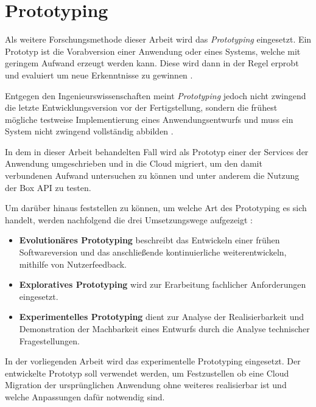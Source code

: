 \section{Prototyping}

Als weitere Forschungsmethode dieser Arbeit wird das \textit{Prototyping} eingesetzt. Ein Prototyp ist die Vorabversion einer Anwendung oder eines Systems, welche mit geringem Aufwand erzeugt werden kann. Diese wird dann in der Regel erprobt und evaluiert um neue Erkenntnisse zu gewinnen \cite[Vgl.][S. 282]{Wilde2007}\cite[Vgl.][S. 114]{Heinrich2011}.

Entgegen den Ingenieurswissenschaften meint \textit{Prototyping} jedoch nicht zwingend die letzte Entwicklungsversion vor der Fertigstellung, sondern die frühest mögliche testweise Implementierung eines Anwendungsentwurfs \cite[Vgl.][S. 114]{Heinrich2011} und muss ein System nicht zwingend vollständig abbilden \cite[Vgl.][S. 119]{Heinrich2011}.

In dem in dieser Arbeit behandelten Fall wird als Prototyp einer der Services der Anwendung umgeschrieben und in die Cloud migriert, um den damit verbundenen Aufwand untersuchen zu können und unter anderem die Nutzung der \gls{Box} \ac{API} zu testen.

Um darüber hinaus feststellen zu können, um welche Art des Prototyping es sich handelt, werden nachfolgend die drei Umsetzungswege aufgezeigt \cite[Vgl. auch im Folgenden][S. 370]{Alpar2019}:
\begin{itemize}
    \item \textbf{Evolutionäres Prototyping} beschreibt das Entwickeln einer frühen Softwareversion und das anschließende kontinuierliche weiterentwickeln, mithilfe von Nutzerfeedback.
    \item \textbf{Exploratives Prototyping} wird zur Erarbeitung fachlicher Anforderungen eingesetzt.
    \item \textbf{Experimentelles Prototyping} dient zur Analyse der Realisierbarkeit und Demonstration der Machbarkeit eines Entwurfs durch die Analyse technischer Fragestellungen.
\end{itemize}

In der vorliegenden Arbeit wird das experimentelle Prototyping eingesetzt. Der entwickelte Prototyp soll verwendet werden, um Festzustellen ob eine Cloud Migration der ursprünglichen Anwendung ohne weiteres realisierbar ist und welche Anpassungen dafür notwendig sind. \pagebreak